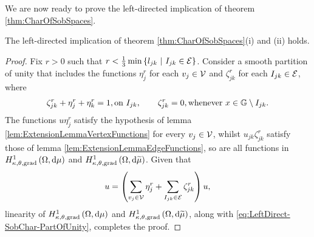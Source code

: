 We are now ready to prove the left-directed implication of theorem \ref{thm:CharOfSobSpaces}.
\begin{theorem} \label{thm:LeftDirect-SobChar}
	The left-directed implication of theorem \ref{thm:CharOfSobSpaces}(i) and (ii) holds.
\end{theorem}
\begin{proof}
	Fix $r>0$ such that $r<\frac{1}{3}\min\left\{ l_{jk} \ \middle\vert \  I_{jk}\in\mathcal{E} \right\}$.
	Consider a smooth partition of unity that includes the functions $\eta_j^r$ for each $v_j\in\mathcal{V}$ and $\zeta_{jk}^r$ for each $I_{jk}\in\mathcal{E}$, where
	\begin{align} \label{eq:LeftDirect-SobChar-PartOfUnity}
		\zeta_{jk}^r + \eta_j^r + \eta_k^r = 1, \text{on } I_{jk}, 
		\qquad
		\zeta_{jk}^r = 0, \text{whenever } x\in\mathbb{G}\setminus I_{jk}.
	\end{align}
	The functions $u\eta_j^r$ satisfy the hypothesis of lemma \ref{lem:ExtensionLemmaVertexFunctions} for every $v_j\in\mathcal{V}$, whilst $u_{jk}\zeta_{jk}^r$ satisfy those of lemma \ref{lem:ExtensionLemmaEdgeFunctions}, so are all functions in $H^1_{\kappa,\theta,\mathrm{grad}}\left( \Omega, \mathrm{d}\mu \right)$ and $H^1_{\kappa,\theta,\mathrm{grad}}\left( \Omega, \mathrm{d}\widetilde{\mu} \right)$.
	Given that
	\begin{align*}
		u = \left(  \sum_{v_j\in\mathcal{V}} \eta_j^r + \sum_{I_{jk}\in\mathcal{E}} \zeta_{jk}^r  \right)u,
	\end{align*}
	linearity of $H^1_{\kappa,\theta,\mathrm{grad}}\left( \Omega, \mathrm{d}\mu \right)$ and $H^1_{\kappa,\theta,\mathrm{grad}}\left( \Omega, \mathrm{d}\widetilde{\mu} \right)$, along with \eqref{eq:LeftDirect-SobChar-PartOfUnity}, completes the proof.
\end{proof}